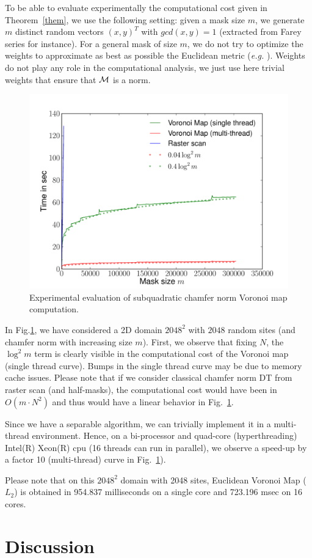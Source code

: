 \documentclass{llncs}
\begin{document}
To be able to evaluate experimentally the
computational cost given in Theorem~\ref{them}, we use the following
setting: given a mask size $m$, we generate $m$ distinct random
vectors $(x,y)^T$ with $gcd(x,y)=1$ (extracted from Farey series for
instance). For a general mask of size $m$, we do not try to optimize
the weights to approximate as best as possible the Euclidean metric
(\emph{e.g.}  \cite{borgefors}). Weights do not play any role in the
computational analysis, we just use here trivial weights that ensure
that $\mathcal{M}$ is a norm.
\begin{figure}[H]
  \includegraphics[width=\textwidth]{data/result}
  \caption{Experimental evaluation of subquadratic chamfer norm
    Voronoi map computation.}
  \label{fig:graph}
\end{figure}
In Fig.\ref{fig:graph}, we have considered a 2D domain $2048^2$ with
$2048$ random sites (and chamfer norm with increasing size
$m$). First, we observe that fixing $N$, the $\log^2{m}$ term is
clearly visible in the computational cost of the Voronoi map (single
thread curve). Bumps in the single thread curve may be due to memory
cache issues. Please note that if we consider classical chamfer norm
DT from raster scan (and half-masks), the computational cost would
have been in $O(m\cdot N^2)$ and thus would have a linear behavior in
Fig.~\ref{fig:graph}.

Since we have a separable algorithm, we can trivially implement it in
a multi-thread environment. Hence, on a bi-processor and quad-core
(hyperthreading) Intel(R) Xeon(R) cpu (16 threads can run in
parallel), we observe a speed-up by a factor 10 (multi-thread) curve
in Fig.~\ref{fig:graph}).

Please note that on this $2048^2$ domain with 2048 sites, Euclidean
Voronoi Map ($L_2$) is obtained in  954.837 milliseconds on a single
core and 723.196 msec on 16 cores.



\section{Discussion}
\label{sec:discussion}



\end{document}
